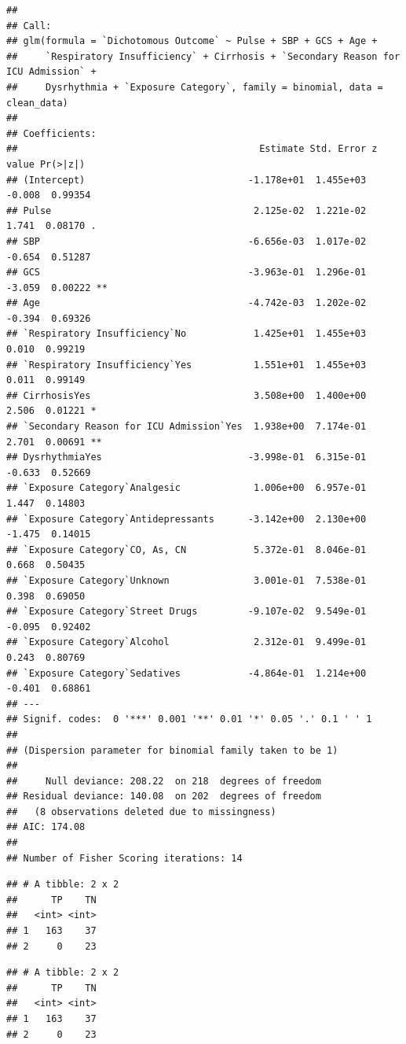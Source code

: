 \documentclass[
]{article}
\begin{document}
\begin{verbatim}
## 
## Call:
## glm(formula = `Dichotomous Outcome` ~ Pulse + SBP + GCS + Age + 
##     `Respiratory Insufficiency` + Cirrhosis + `Secondary Reason for ICU Admission` + 
##     Dysrhythmia + `Exposure Category`, family = binomial, data = clean_data)
## 
## Coefficients:
##                                           Estimate Std. Error z value Pr(>|z|)   
## (Intercept)                             -1.178e+01  1.455e+03  -0.008  0.99354   
## Pulse                                    2.125e-02  1.221e-02   1.741  0.08170 . 
## SBP                                     -6.656e-03  1.017e-02  -0.654  0.51287   
## GCS                                     -3.963e-01  1.296e-01  -3.059  0.00222 **
## Age                                     -4.742e-03  1.202e-02  -0.394  0.69326   
## `Respiratory Insufficiency`No            1.425e+01  1.455e+03   0.010  0.99219   
## `Respiratory Insufficiency`Yes           1.551e+01  1.455e+03   0.011  0.99149   
## CirrhosisYes                             3.508e+00  1.400e+00   2.506  0.01221 * 
## `Secondary Reason for ICU Admission`Yes  1.938e+00  7.174e-01   2.701  0.00691 **
## DysrhythmiaYes                          -3.998e-01  6.315e-01  -0.633  0.52669   
## `Exposure Category`Analgesic             1.006e+00  6.957e-01   1.447  0.14803   
## `Exposure Category`Antidepressants      -3.142e+00  2.130e+00  -1.475  0.14015   
## `Exposure Category`CO, As, CN            5.372e-01  8.046e-01   0.668  0.50435   
## `Exposure Category`Unknown               3.001e-01  7.538e-01   0.398  0.69050   
## `Exposure Category`Street Drugs         -9.107e-02  9.549e-01  -0.095  0.92402   
## `Exposure Category`Alcohol               2.312e-01  9.499e-01   0.243  0.80769   
## `Exposure Category`Sedatives            -4.864e-01  1.214e+00  -0.401  0.68861   
## ---
## Signif. codes:  0 '***' 0.001 '**' 0.01 '*' 0.05 '.' 0.1 ' ' 1
## 
## (Dispersion parameter for binomial family taken to be 1)
## 
##     Null deviance: 208.22  on 218  degrees of freedom
## Residual deviance: 140.08  on 202  degrees of freedom
##   (8 observations deleted due to missingness)
## AIC: 174.08
## 
## Number of Fisher Scoring iterations: 14
\end{verbatim}

\begin{verbatim}
## # A tibble: 2 x 2
##      TP    TN
##   <int> <int>
## 1   163    37
## 2     0    23
\end{verbatim}

\begin{verbatim}
## # A tibble: 2 x 2
##      TP    TN
##   <int> <int>
## 1   163    37
## 2     0    23
\end{verbatim}
\end{document}
